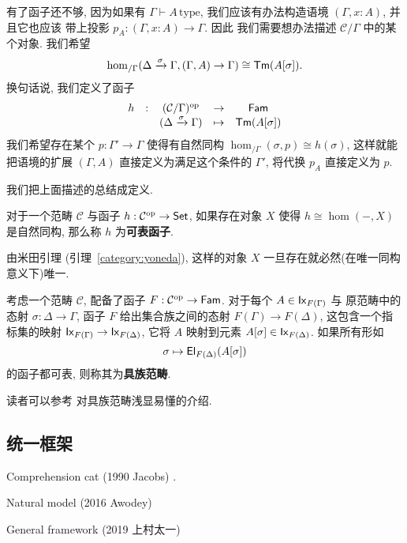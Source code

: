 有了函子还不够, 因为如果有 \(\Gamma \vdash A\,\text{type}\),
我们应该有办法构造语境 \((\Gamma, x{:}A)\), 并且它也应该
带上投影 \(p_A : (\Gamma,x{:}A) \to \Gamma\). 因此
我们需要想办法描述 \(\mathcal C/\Gamma\) 中的某个对象.
我们希望
\[\hom_{/\Gamma}(\Delta \xrightarrow\sigma \Gamma,
(\Gamma,A) \to \Gamma)
\cong \textnormal{\textsf{Tm}}(A[\sigma]).\]
换句话说, 我们定义了函子
\[\begin{matrix}
h &:& (\mathcal C/\Gamma)^{\textrm{op}} &\to& \textnormal{\textsf{Fam}}\\
& & (\Delta \xrightarrow\sigma \Gamma) &\mapsto& \textnormal{\textsf{Tm}}(A[\sigma])
\end{matrix}\]
我们希望存在某个 \(p : \Gamma'\to \Gamma\) 使得有自然同构
\(\hom_{/\Gamma}(\sigma, p) \cong h(\sigma)\),
这样就能把语境的扩展 \((\Gamma, A)\) 直接定义为满足这个条件的
\(\Gamma'\), 将代换 \(p_A\) 直接定义为 \(p\).

我们把上面描述的总结成定义.
\begin{definition}
对于一个范畴 \(\mathcal C\) 与函子 \(h : \mathcal C^{\textrm{op}} \to \textnormal{\textsf{Set}}\),
如果存在对象 \(X\) 使得 \(h \cong \hom(-,X)\) 是自然同构,
那么称 \(h\) 为\textbf{可表函子}.
\end{definition}
由米田引理 (引理~\ref{category:yoneda}), 这样的对象 \(X\)
一旦存在就必然(在唯一同构意义下)唯一.
\begin{definition}
考虑一个范畴 \(\mathcal C\), 配备了函子
\(F : \mathcal C^{\textrm{op}} \to \textnormal{\textsf{Fam}}\).
对于每个 \(A \in \textnormal{\textsf{Ix}}_{F(\Gamma)}\) 与
原范畴中的态射 \(\sigma : \Delta\to\Gamma\),
函子 \(F\) 给出集合族之间的态射 \(F(\Gamma) \to F(\Delta)\),
这包含一个指标集的映射 \(\textnormal{\textsf{Ix}}_{F(\Gamma)} \to \textnormal{\textsf{Ix}}_{F(\Delta)}\),
它将 \(A\) 映射到元素 \(A[\sigma] \in \textnormal{\textsf{Ix}}_{F(\Delta)}\).
如果所有形如
\[\sigma \mapsto \textnormal{\textsf{El}}_{F(\Delta)}(A[\sigma])\]
的函子都可表, 则称其为\textbf{具族范畴}.
\end{definition}

读者可以参考 \cite{castellan:2019:cwf} 对具族范畴浅显易懂的介绍.

\subsection{统一框架}

Comprehension cat (1990 Jacobs) \cite{jacobs:1993:comprehensioncat}.

Natural model (2016 Awodey)
\cite{awodey:2018:natural}

General framework (2019 上村太一)
\cite{uemura:2019:general}

